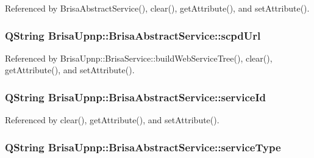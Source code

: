 Referenced by BrisaAbstractService(), clear(), getAttribute(), and setAttribute().\hypertarget{classBrisaUpnp_1_1BrisaAbstractService_aa254b466f38b49b921ed7a25aea7cc8c}{
\subsubsection[{scpdUrl}]{\setlength{\rightskip}{0pt plus 5cm}QString {\bf BrisaUpnp::BrisaAbstractService::scpdUrl}}}
\label{classBrisaUpnp_1_1BrisaAbstractService_aa254b466f38b49b921ed7a25aea7cc8c}


Referenced by BrisaUpnp::BrisaService::buildWebServiceTree(), clear(), getAttribute(), and setAttribute().\hypertarget{classBrisaUpnp_1_1BrisaAbstractService_ad72b169651a6c617d27d51e7f706410d}{
\subsubsection[{serviceId}]{\setlength{\rightskip}{0pt plus 5cm}QString {\bf BrisaUpnp::BrisaAbstractService::serviceId}}}
\label{classBrisaUpnp_1_1BrisaAbstractService_ad72b169651a6c617d27d51e7f706410d}


Referenced by clear(), getAttribute(), and setAttribute().\hypertarget{classBrisaUpnp_1_1BrisaAbstractService_a670933cc6c8581e2f70f52a97d425e4c}{
\subsubsection[{serviceType}]{\setlength{\rightskip}{0pt plus 5cm}QString {\bf BrisaUpnp::BrisaAbstractService::serviceType}}}
\label{classBrisaUpnp_1_1BrisaAbstractService_a670933cc6c8581e2f70f52a97d425e4c}



